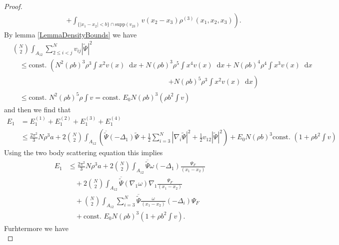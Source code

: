 \documentclass[a4paper,11pt]{article}
\newcommand{\supp}{\text{supp}}
\newcommand{\abs}[1]{\left\lvert #1 \right\rvert}
\newcommand*\diff{\mathop{}\!\mathrm{d}}
\numberwithin{equation}{section}
\begin{document}
\begin{proof}
\begin{equation}
\begin{aligned}
		&\qquad\qquad\qquad\left.+\int_{\{\abs{x_1-x_2}<b\}\cap\supp(v_{23})}v(x_2-x_3)\rho^{(3)}(x_1,x_2,x_3)\right).
		\end{aligned}
		\end{equation}
		By lemma \ref{LemmaDensityBounds} we have
		\begin{equation}
		\begin{aligned}
		&\binom{N}{2}\int_{A_{12}} \sum_{2\leq i<j}^{N}v_{ij}\abs{\tilde{\Psi}}^2\\&\quad\leq \text{const. } \left(N^2(\rho b)^3\rho^3\int x^2 v(x)\diff x+N(\rho b)^3 \rho^5 \int x^4 v(x)\diff x+N(\rho b)^4\rho^4 \int x^3 v(x)\diff x\right.\\
		&\qquad \qquad \qquad \qquad\hspace{6cm}\left.+N(\rho b)^5 \rho^3 \int x^2 v(x)\diff x\right)\\
		&\quad \leq \text{const. } N^2(\rho b)^5\rho \int v=\text{const. }E_0 N (\rho b)^3 \left(\rho b^2\int v\right)
		\end{aligned}
		\end{equation}
		and then we find that \begin{equation}
		\begin{aligned}
		E_1&=E_1^{(1)}+E_1^{(2)}+E_1^{(3)}+E_1^{(4)}\\&\leq \frac{2\pi^2}{3}N\rho^3 a+2\binom{N}{2}\int_{A_{12}}\left(\overline{\tilde{\Psi}}(-\Delta_1)\tilde{\Psi}+\frac{1}{2}\sum_{i=3}^{N}\abs{\nabla_i\tilde{\Psi}}^2+\frac{1}{2}v_{12}\abs{\tilde{\Psi}}^2\right)+E_0N(\rho b)^3\text{const. }\left(1+\rho b^2 \int v\right)
		\end{aligned}
		\end{equation}
		Using the two body scattering equation this implies \begin{equation}
		\begin{aligned}
		E_1&\leq \frac{2\pi^2}{3}N\rho^3 a+2\binom{N}{2}\int_{A_{12}}\overline{\tilde{\Psi}}\omega(-\Delta_1)\frac{\Psi_F}{(x_1-x_2)}\\&\quad+2\binom{N}{2}\int_{A_{12}}\overline{\tilde{\Psi}}(\nabla_1\omega)\nabla_1\frac{\Psi_F}{(x_1-x_2)}\\
		&\quad +\binom{N}{2}\int_{A_{12}}\sum_{i=3}^{N} \overline{\tilde{\Psi}}\frac{\omega}{(x_1-x_2)}(-\Delta_i)\Psi_F
		\\&\quad+\text{const. }E_0 N (\rho b)^3 \left(1+\rho b^2\int v\right).
		\end{aligned}
		\end{equation}
		Furhtermore we have \begin{equation}

\end{equation}
\end{proof}
\end{document}
